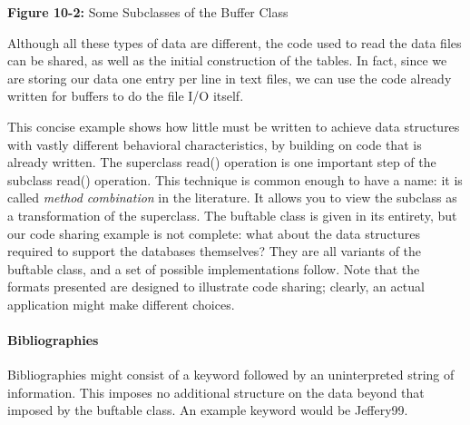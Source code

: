 {\sffamily\bfseries Figure 10-2:}
{\sffamily Some Subclasses of the Buffer Class}

\bigskip

Although all these types of data are different, the code used to read
the data files can be shared, as well as the initial construction of
the tables. In fact, since we are storing our data one entry per line
in text files, we can use the code already written for buffers to do
the file I/O itself. 


This concise example shows how little must be written to achieve data
structures with vastly different behavioral characteristics, by
building on code that is already written. The superclass
\textsf{read()} operation is one important step of the subclass
\textsf{read()} operation. This technique is common enough to have a
name: it is called \textit{method
}\textit{combination} in the literature. It
allows you to view the subclass as a transformation of the superclass.
The \textsf{buftable} class is given in its entirety, but our code
sharing example is not complete: what about the data structures
required to support the databases themselves? They are all variants of
the \textsf{buftable} class, and a set of possible implementations
follow. Note that the formats presented are designed to illustrate code
sharing; clearly, an actual application might make different choices. 

\paragraph{Bibliographies}
Bibliographies might consist of a keyword followed by an uninterpreted
string of information. This imposes no additional structure on the data
beyond that imposed by the \textsf{buftable} class. An example keyword
would be Jeffery99. 

